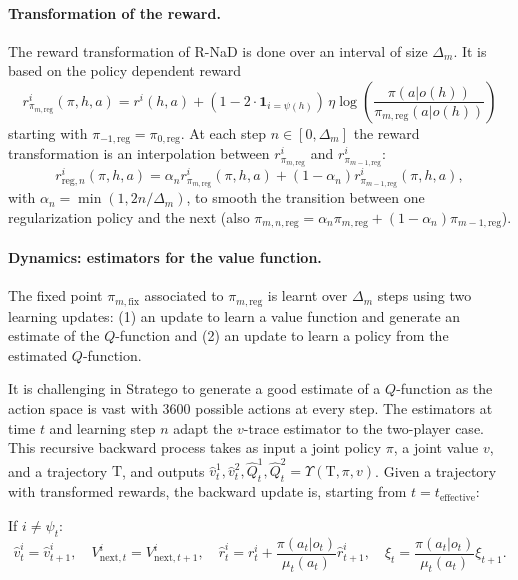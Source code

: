 \paragraph{Transformation of the reward.}
The reward transformation of R-NaD is done over an interval of size $\Delta_{m}$. It is based on the policy dependent reward
$$r^i_{\pi_{m,\textrm{reg}}}(\pi, h, a) = r^i(h,a) + (1-2 \cdot \mathbf{1}_{i = \psi(h)})\,\eta \log\!\left(\frac{\pi(a|o(h))}{\pi_{m, \textrm{reg}}(a|o(h))}\right)$$
starting with $\pi_{-1,\textrm{reg}}=\pi_{0,\textrm{reg}}$. At each step $n\in [0,\Delta_m]$ the reward transformation is an interpolation between $r^i_{\pi_{m,\textrm{reg}}}$ and $r^i_{\pi_{m-1,\textrm{reg}}}$:
$$r^i_{\textrm{reg},n}(\pi, h, a) = \alpha_n r^i_{\pi_{m,\textrm{reg}}}(\pi, h, a) + (1-\alpha_n)r^i_{\pi_{m-1,\textrm{reg}}}(\pi, h, a),$$
with $\alpha_n = \min(1,2n/\Delta_{m})$, to smooth the transition between one regularization policy and the next (also $\pi_{m, n, \textrm{reg}} = \alpha_n \pi_{m,\textrm{reg}} + (1-\alpha_n)\pi_{m-1,\textrm{reg}}$).

\paragraph{Dynamics: estimators for the value function.}
The fixed point $\pi_{m,\textrm{fix}}$ associated to $\pi_{m,\textrm{reg}}$ is learnt over $\Delta_{m}$ steps using two learning updates: (1) an update to learn a value function and generate an estimate of the $Q$-function and (2) an update to learn a policy from the estimated $Q$-function.

It is challenging in Stratego to generate a good estimate of a $Q$-function as the action space is vast with 3600 possible actions at every step. The estimators at time $t$ and learning step $n$ adapt the $v$-trace estimator to the two-player case. This recursive backward process takes as input a joint policy $\pi$, a joint value $v$, and a trajectory $\mathrm{T}$, and outputs $\hat v^1_t, \hat v^2_t, \hat Q^1_t, \hat Q^2_t = \Upsilon(\mathrm{T}, \pi, v)$. Given a trajectory with transformed rewards, the backward update is, starting from $t=t_{\textrm{effective}}$:

If $i \neq \psi_t$:
$$\hat v^i_t = \hat v^i_{t+1},\quad V^i_{\textrm{next},t} = V^i_{\textrm{next},t+1},\quad \hat r^i_t = r^i_t + \frac{\pi(a_t|o_t)}{\mu_t(a_t)} \hat r^i_{t+1},\quad \xi_t = \frac{\pi(a_t|o_t)}{\mu_t(a_t)}\xi_{t+1}.$$

